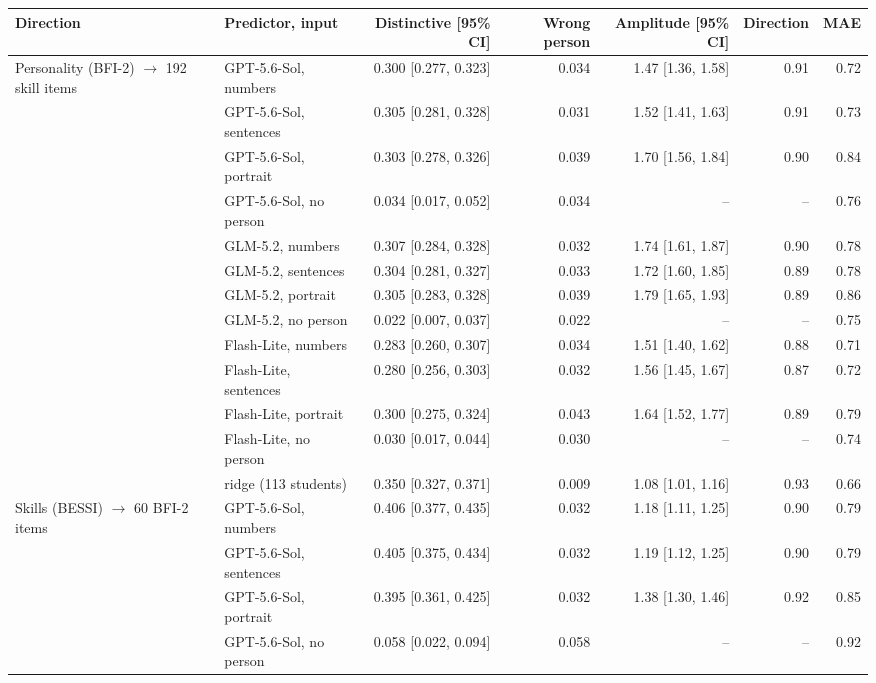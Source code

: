 \begin{table}[tp]\centering\scriptsize\setlength{\tabcolsep}{3pt}
\begin{tabular}{@{}llrrrrr@{}}\toprule
Direction & Predictor, input & Distinctive [95\% CI] & Wrong person & Amplitude [95\% CI] & Direction & MAE \\ \midrule
Personality (BFI-2) $\rightarrow$ 192 skill items & GPT-5.6-Sol, numbers & 0.300 [0.277, 0.323] & 0.034 & 1.47 [1.36, 1.58] & 0.91 & 0.72 \\
 & GPT-5.6-Sol, sentences & 0.305 [0.281, 0.328] & 0.031 & 1.52 [1.41, 1.63] & 0.91 & 0.73 \\
 & GPT-5.6-Sol, portrait & 0.303 [0.278, 0.326] & 0.039 & 1.70 [1.56, 1.84] & 0.90 & 0.84 \\
 & GPT-5.6-Sol, no person & 0.034 [0.017, 0.052] & 0.034 & -- & -- & 0.76 \\
 & GLM-5.2, numbers & 0.307 [0.284, 0.328] & 0.032 & 1.74 [1.61, 1.87] & 0.90 & 0.78 \\
 & GLM-5.2, sentences & 0.304 [0.281, 0.327] & 0.033 & 1.72 [1.60, 1.85] & 0.89 & 0.78 \\
 & GLM-5.2, portrait & 0.305 [0.283, 0.328] & 0.039 & 1.79 [1.65, 1.93] & 0.89 & 0.86 \\
 & GLM-5.2, no person & 0.022 [0.007, 0.037] & 0.022 & -- & -- & 0.75 \\
 & Flash-Lite, numbers & 0.283 [0.260, 0.307] & 0.034 & 1.51 [1.40, 1.62] & 0.88 & 0.71 \\
 & Flash-Lite, sentences & 0.280 [0.256, 0.303] & 0.032 & 1.56 [1.45, 1.67] & 0.87 & 0.72 \\
 & Flash-Lite, portrait & 0.300 [0.275, 0.324] & 0.043 & 1.64 [1.52, 1.77] & 0.89 & 0.79 \\
 & Flash-Lite, no person & 0.030 [0.017, 0.044] & 0.030 & -- & -- & 0.74 \\
 & ridge (113 students) & 0.350 [0.327, 0.371] & 0.009 & 1.08 [1.01, 1.16] & 0.93 & 0.66 \\
\midrule
Skills (BESSI) $\rightarrow$ 60 BFI-2 items & GPT-5.6-Sol, numbers & 0.406 [0.377, 0.435] & 0.032 & 1.18 [1.11, 1.25] & 0.90 & 0.79 \\
 & GPT-5.6-Sol, sentences & 0.405 [0.375, 0.434] & 0.032 & 1.19 [1.12, 1.25] & 0.90 & 0.79 \\
 & GPT-5.6-Sol, portrait & 0.395 [0.361, 0.425] & 0.032 & 1.38 [1.30, 1.46] & 0.92 & 0.85 \\
 & GPT-5.6-Sol, no person & 0.058 [0.022, 0.094] & 0.058 & -- & -- & 0.92 \\

\end{tabular}
\end{table}
